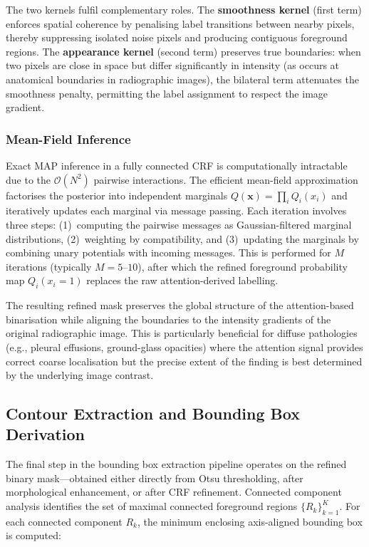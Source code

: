 The two kernels fulfil complementary roles. The \textbf{smoothness kernel} (first term) enforces spatial coherence by penalising label transitions between nearby pixels, thereby suppressing isolated noise pixels and producing contiguous foreground regions. The \textbf{appearance kernel} (second term) preserves true boundaries: when two pixels are close in space but differ significantly in intensity (as occurs at anatomical boundaries in radiographic images), the bilateral term attenuates the smoothness penalty, permitting the label assignment to respect the image gradient.

\subsubsection{Mean-Field Inference}

Exact MAP inference in a fully connected CRF is computationally intractable due to the $\mathcal{O}(N^2)$ pairwise interactions. The efficient mean-field approximation factorises the posterior into independent marginals $Q(\mathbf{x}) = \prod_{i} Q_i(x_i)$ and iteratively updates each marginal via message passing. Each iteration involves three steps: (1)~computing the pairwise messages as Gaussian-filtered marginal distributions, (2)~weighting by compatibility, and (3)~updating the marginals by combining unary potentials with incoming messages. This is performed for $M$ iterations (typically $M = 5$--$10$), after which the refined foreground probability map $Q_i(x_i = 1)$ replaces the raw attention-derived labelling.

The resulting refined mask preserves the global structure of the attention-based binarisation while aligning the boundaries to the intensity gradients of the original radiographic image. This is particularly beneficial for diffuse pathologies (e.g., pleural effusions, ground-glass opacities) where the attention signal provides correct coarse localisation but the precise extent of the finding is best determined by the underlying image contrast.

\subsection{Contour Extraction and Bounding Box Derivation}
\label{sec:3_4_4}

The final step in the bounding box extraction pipeline operates on the refined binary mask---obtained either directly from Otsu thresholding, after morphological enhancement, or after CRF refinement. Connected component analysis identifies the set of maximal connected foreground regions $\{R_k\}_{k=1}^{K}$. For each connected component $R_k$, the minimum enclosing axis-aligned bounding box is computed:

